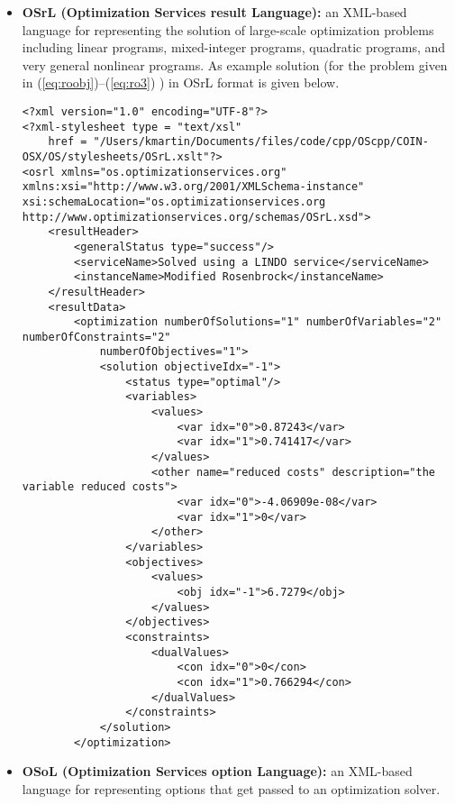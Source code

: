 \documentclass[11pt]{article}
\renewcommand{\_}{{\char"5F}}
\renewcommand{\{}{{\char"7B}}
\renewcommand{\}}{{\char"7D}}
\renewcommand{\^}{{\char"0D}}
\renewcommand{\'}{{\char"0D}}
\begin{document}
\begin{itemize}
\item[] {\bf OSrL (Optimization Services result Language):}  an
XML-based language for representing the solution of large-scale
optimization problems including linear programs, mixed-integer programs,
quadratic programs, and very general nonlinear programs.  As example solution (for the problem given in
 (\ref{eq:roobj})--(\ref{eq:ro3}) ) in OSrL format is given below. 

\begin{verbatim}
<?xml version="1.0" encoding="UTF-8"?>
<?xml-stylesheet type = "text/xsl" 
    href = "/Users/kmartin/Documents/files/code/cpp/OScpp/COIN-OSX/OS/stylesheets/OSrL.xslt"?>
<osrl xmlns="os.optimizationservices.org" 
xmlns:xsi="http://www.w3.org/2001/XMLSchema-instance"
xsi:schemaLocation="os.optimizationservices.org
http://www.optimizationservices.org/schemas/OSrL.xsd">
    <resultHeader>
        <generalStatus type="success"/>
        <serviceName>Solved using a LINDO service</serviceName>
        <instanceName>Modified Rosenbrock</instanceName>
    </resultHeader>
    <resultData>
        <optimization numberOfSolutions="1" numberOfVariables="2" numberOfConstraints="2"
            numberOfObjectives="1">
            <solution objectiveIdx="-1">
                <status type="optimal"/>
                <variables>
                    <values>
                        <var idx="0">0.87243</var>
                        <var idx="1">0.741417</var>
                    </values>
                    <other name="reduced costs" description="the variable reduced costs">
                        <var idx="0">-4.06909e-08</var>
                        <var idx="1">0</var>
                    </other>
                </variables>
                <objectives>
                    <values>
                        <obj idx="-1">6.7279</obj>
                    </values>
                </objectives>
                <constraints>
                    <dualValues>
                        <con idx="0">0</con>
                        <con idx="1">0.766294</con>
                    </dualValues>
                </constraints>
            </solution>
        </optimization>

\end{verbatim}




\item[] {\bf OSoL (Optimization Services option Language):}  an
XML-based language for representing options that get passed to an optimization solver. 


\end{itemize}
\end{document}
